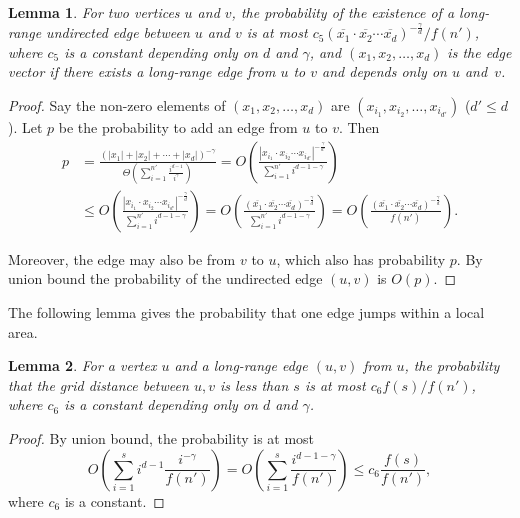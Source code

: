 \documentclass[11pt]{article}
\newtheorem{lem}{Lemma}
\begin{document}
\begin{lem} \label{lemma:probedge}
For two vertices $u$ and $v$, the probability of the existence of a
	long-range undirected edge between $u$ and $v$ is at most 
	$c_5(\overline{x_1}\cdot\overline{x_2}\cdots\overline{x_d})^{-\frac{\gamma}{d}}
	/ f(n')$,
	 where $c_5$ is a constant depending only on $d$ and $\gamma$, and $(x_1,x_2,\ldots,x_d)$ is the edge vector if there exists a long-range edge from $u$ to $v$ and depends only on $u$ and~$v$.
\end{lem}

\begin{proof}
Say the non-zero elements of $(x_1,x_2,\ldots,x_d)$ are $(x_{i_1},x_{i_2},\ldots,x_{i_{d'}})$ ($d'\leq d$). Let $p$ be the probability to add an edge from $u$ to $v$. Then
\begin{align*}
p&=\frac{(|x_1|+|x_2|+\cdots+|x_d|)^{-\gamma}}{\Theta(\sum_{i=1}^{n'}\frac{i^{d-1}}{i^\gamma})}=O\left(\frac{|x_{i_1}\cdot x_{i_2}\cdots x_{i_{d'}}|^{-\frac{\gamma}{d'}}}{\sum_{i=1}^{n'} i^{d-1-\gamma}}\right) \\
&\leq O\left(\frac{|x_{i_1}\cdot x_{i_2}\cdots x_{i_{d'}}|^{-\frac{\gamma}{d}}}{\sum_{i=1}^{n'} i^{d-1-\gamma}}\right)=O\left(\frac{(\overline{x_1}\cdot\overline{x_2}\cdots\overline{x_d})^{-\frac{\gamma}{d}}}{\sum_{i=1}^{n'} i^{d-1-\gamma}}\right)=O\left(\frac{(\overline{x_1}\cdot\overline{x_2}\cdots\overline{x_d})^{-\frac{\gamma}{d}}}{f(n')}\right).
\end{align*}

Moreover, the edge may also be from $v$ to $u$, which also has probability $p$. By union bound the probability of the undirected 
	edge $(u,v)$ is $O(p)$.
\end{proof}

The following lemma gives the probability that one edge jumps within a local area.

\begin{lem} \label{lemma:localjump}
For a vertex $u$ and a long-range edge $(u,v)$ from $u$, the probability that the grid distance between $u,v$ is less than $s$ is at most $c_6f(s)/f(n')$, where $c_6$ is a constant depending only on $d$ and $\gamma$.
\end{lem}

\begin{proof}
By union bound, the probability is at most
\[O\left(\sum_{i=1}^si^{d-1}\frac{i^{-\gamma}}{f(n')}\right)=O\left(\sum_{i=1}^s\frac{i^{d-1-\gamma}}{f(n')}\right)\leq c_6\frac{f(s)}{f(n')},\]
where $c_6$ is a constant.
\end{proof}
\end{document}
